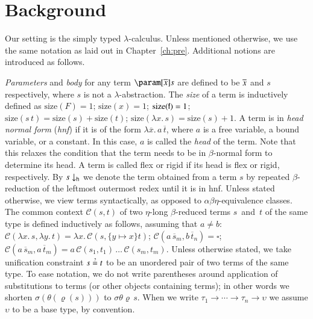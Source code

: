 \section{Background}
\label{sec:unif:background}

Our setting is the simply typed $\lambda$-calculus. Unless mentioned otherwise,
we use the same notation as laid out in Chapter~\ref{ch:pre}. Additional notions
are introduced as follows.

\emph{Parameters} and \emph{body} for any term $\param[\seq x]s$ are defined to
be $\overline{x}$ and $s$ respectively, where $s$ is not a $\lambda$-abstraction. The
\emph{size} of a term is inductively defined as $\text{size}(F) = 1$;
$\text{size}(x) = 1$; $\text{size}(\mathsf{f}) = 1$; $\text{size}(s\,t) =
\text{size}(s) + \text{size}(t)$; $\text{size}(\lambda x.\, s) = \text{size}(s)
+ 1$. A term is in \emph{head normal form} ({\em hnf}) if it is of the form
$\lambda \overline{x}.\,a\,\overline{t}$, where $a$ is a free variable, a bound
variable, or a constant. In this case, $a$ is called the \emph{head} of the
term. Note that this relaxes the condition that the term needs to be in
$\beta$-normal form to determine its head. A term is called flex or rigid if its
head is flex or rigid, respectively. By $\nf{s}{\textsf{h}}$ we denote the term
obtained from a term $s$ by repeated $\beta$-reduction of the leftmost outermost
redex until it is in hnf. Unless stated otherwise, we view terms syntactically,
as opposed to $\alpha\beta\eta$-equivalence classes. The common context
$\mathcal{C}(s,t)$ of two $\eta$-long $\beta$-reduced terms $s$~and~$t$ of the
same type is defined inductively as follows, assuming that $a \not= b$:
$\mathcal{C}(\lambda x.\, s, \lambda y.\, t) = \lambda x.\,
\mathcal{C}(s,\{y\mapsto x\}t)$; $\mathcal{C}(a\,\overline{s}_m,
b\,\overline{t}_n) = \square$; $\mathcal{C}(a\,\overline{s}_m,
a\,\overline{t}_m) = a\,\mathcal{C}(s_1,t_1)\,\ldots\,\mathcal{C}(s_m,t_m)$.
Unless otherwise stated, we take unification constraint $s \unif t$ to be an
unordered pair of two terms of the same type. To ease notation, we do not write
parentheses around application of substitutions to terms (or other objects containing terms);
in other words we shorten $\sigma(\theta(\varrho(s)))$ to $\sigma\theta\varrho \, s$. When we write $\tau_1
\rightarrow \cdots \rightarrow \tau_n \rightarrow \upsilon$ we assume $\upsilon$
to be a base type, by convention.

